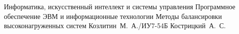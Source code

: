
\makeresearchtitle
    {Информатика, искусственный интеллект и системы управления}
    {Программное обеспечение ЭВМ и информационные технологии}
    {Методы балансировки высоконагруженных систем}
    {Козлитин~М.~А./ИУ7-54Б}
    {Кострицкий~А.~С.}
    